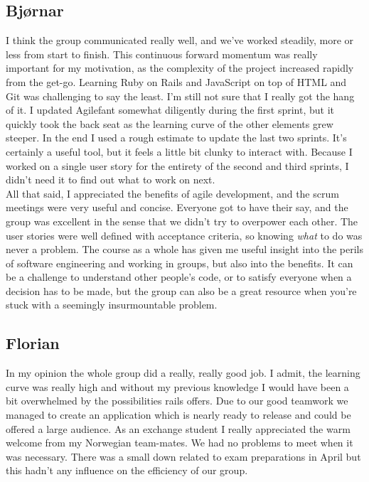 \documentclass[a4paper]{article}
\begin{document}
\subsection{Bjørnar}
I think the group communicated really well, and we've worked steadily, more or less from start to finish. This continuous forward momentum was really important for my motivation, as the complexity of the project increased rapidly from the get-go. Learning Ruby on Rails and JavaScript on top of HTML and Git was challenging to say the least. I'm still not sure that I really got the hang of it. I updated Agilefant somewhat diligently during the first sprint, but it quickly took the back seat as the learning curve of the other elements grew steeper. In the end I used a rough estimate to update the last two sprints. It's certainly a useful tool, but it feels a little bit clunky to interact with. Because I worked on a single user story for the entirety of the second and third sprints, I didn't need it to find out what to work on next.\\

\noindent
All that said, I appreciated the benefits of agile development, and the scrum meetings were very useful and concise. Everyone got to have their say, and the group was excellent in the sense that we didn't try to overpower each other. The user stories were well defined with acceptance criteria, so knowing \textit{what} to do was never a problem. The course as a whole has given me useful insight into the perils of software engineering and working in groups, but also into the benefits. It can be a challenge to understand other people's code, or to satisfy everyone when a decision has to be made, but the group can also be a great resource when you're stuck with a seemingly insurmountable problem.

\subsection{Florian}
In my opinion the whole group did a really, really good job. I admit, the learning curve was really high and without my previous knowledge I would have been a bit overwhelmed by the possibilities rails offers. Due to our good teamwork we managed to create an application which is nearly ready to release and could be offered a large audience. As an exchange student I really appreciated the warm welcome from my Norwegian team-mates. We had no problems to meet when it was necessary. There was a small down related to exam preparations in April but this hadn't any influence on the efficiency of our group.
\end{document}
